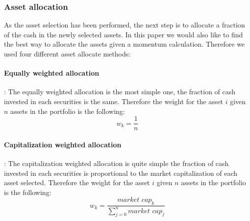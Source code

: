 \documentclass{article}
\begin{document}
\subsubsection{Asset allocation}\label{subsubsec:assetalloc}
As the asset selection has been performed, the next step is to allocate a fraction of the cash in the newly selected assets. In this paper we would also like to find the best way to allocate the assets given a momentum calculation. Therefore we used four different asset allocate methods:\newline\newline
\paragraph{Equally weighted allocation} : The equally weighted allocation is the most simple one, the fraction of cash invested in each securities is the same. Therefore the weight for the asset $i$ given $n$ assets in the portfolio is the following: $$w_k=\frac{1}{n}$$
\paragraph{Capitalization weighted allocation} : The capitalization weighted allocation is quite simple the fraction of cash invested in each securities is proportional to the market capitalization of each asset selected. Therefore the weight for the asset $i$ given $n$ assets in the portfolio is the following: $$w_k=\frac{\textit{market cap}_k}{\sum_{j=0}^n\textit{market cap}_j}$$
\end{document}
